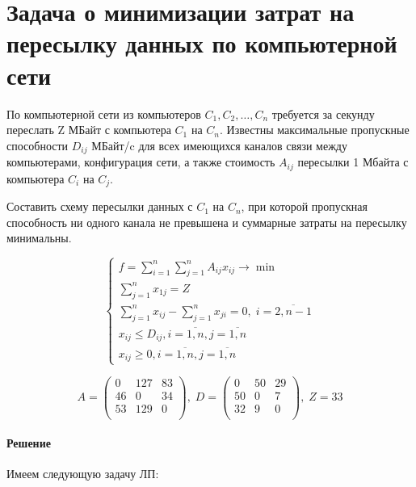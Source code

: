 \documentclass[a4paper]{article}
\theoremstyle{definition}
\theoremstyle{remark}
\begin{document}
\section*{Задача о минимизации затрат на пересылку данных по компьютерной сети}

По компьютерной сети из компьютеров $C_1, C_2, \dots, C_n$ требуется за секунду переслать Z МБайт с компьютера $C_1$ на $C_n.$ Известны максимальные пропускные способности $D_{ij}$ МБайт/c для всех имеющихся каналов связи между компьютерами, конфигурация сети, а также стоимость $A_{ij}$ пересылки 1 Мбайта с компьютера $C_i$ на $C_j$.

Составить схему пересылки данных с $C_1$ на $C_n$, при которой пропускная способность ни одного канала не превышена и суммарные затраты на пересылку минимальны.

\[\begin{cases}
		f = \sum\limits_{i = 1}^n\sum\limits_{j=1}^n A_{ij} x_{ij}\to \min                        \\
		\sum\limits_{j = 1}^n x_{1j} = Z                                                   \\
		\sum\limits_{j = 1}^n x_{ij} - \sum\limits_{j = 1}^n x_{ji} = 0, \; i = \overline{2, n-1} \\
		x_{ij} \le D_{ij}, i = \overline{1, n}, j = \overline{1, n}                 \\
		x_{ij}\ge 0, i = \overline{1, n}, j = \overline{1, n}
	\end{cases}\]

$$A = \begin{pmatrix}
		0  & 127 & 83 \\
		46 & 0   & 34 \\
		53 & 129 & 0  \\
	\end{pmatrix}, \; D = \begin{pmatrix}
		0  & 50 & 29 \\
		50 & 0  & 7  \\
		32 & 9  & 0  \\
	\end{pmatrix}, \; Z = 33$$
\paragraph*{Решение}
Имеем следующую задачу ЛП:
\end{document}
